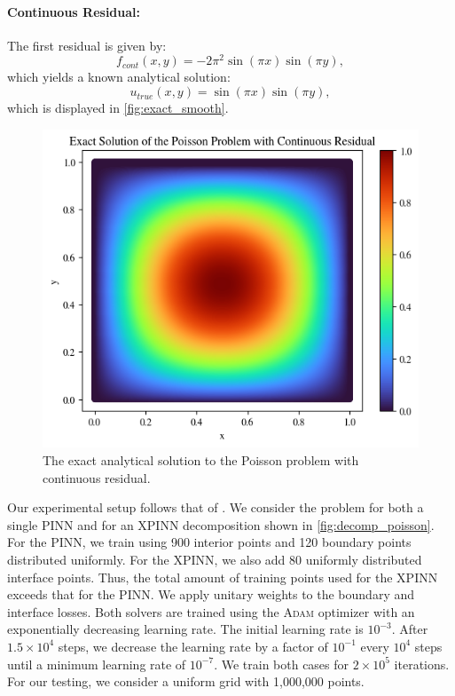 \paragraph{Continuous Residual:}
The first residual is given by:
\begin{equation}
    f_{cont}(x,y)= -2\pi^2\sin(\pi x) \sin(\pi y),
    \label{eq:continuous_poisson}
\end{equation}
which yields a known analytical solution:
\begin{equation*}
    u_{true}(x,y)=\sin(\pi x) \sin(\pi y),
\end{equation*}
which is displayed in \autoref{fig:exact_smooth}.

\begin{figure}
    \centering
    \includegraphics[width = \linewidth]{Project1XPINNs/figures/Poisson/Exact_Smooth.png}
    \caption{The exact analytical solution to the Poisson problem with continuous residual.}
    \label{fig:exact_smooth}
\end{figure}
Our experimental setup follows that of \textcite{müller2023achieving}.
We consider the problem for both a single PINN and for an XPINN decomposition shown in \autoref{fig:decomp_poisson}.
For the PINN, we train using 900 interior points and 120 boundary points distributed uniformly.
For the XPINN, we also add 80 uniformly distributed interface points. Thus, the total amount of training points used for the XPINN exceeds that for the PINN. We apply unitary weights to the boundary and interface losses.
Both solvers are trained using the \textsc{Adam} optimizer with an exponentially decreasing learning rate.
The initial learning rate is $10^{-3}$.
After $1.5\times 10^4$ steps, we decrease the learning rate by a factor of $10^{-1}$ every $10^4$ steps until a minimum learning rate of $10^{-7}$.
We train both cases for $2\times 10^5$ iterations. For our testing, we consider a uniform grid with 1,000,000 points. 


